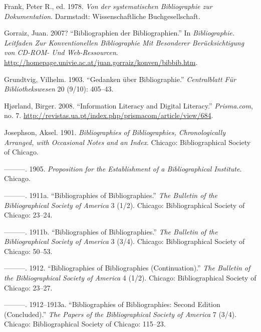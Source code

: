\documentclass[a4paper,
fontsize=11pt,
oneside,
numbers=noperiodatend,
parskip=half-,
bibliography=totoc,
final
]{scrartcl}
\begin{document}
Frank, Peter R., ed. 1978. \emph{Von der systematischen Bibliographie
zur Dokumentation}. Darmstadt: Wissenschaftliche Buchgesellschaft.

Gorraiz, Juan. 2007? ``Bibliographien der Bibliographien.'' In
\emph{Bibliographie. Leitfaden Zur Konventionellen Bibliographie Mit
Besonderer Berücksichtigung von CD-ROM- Und Web-Ressourcen}.
\url{http://homepage.univie.ac.at/juan.gorraiz/konven/bibbib.htm}.

Grundtvig, Vilhelm. 1903. ``Gedanken über Bibliographie.''
\emph{Centralblatt Für Bibliothekswesen} 20 (9/10): 405--43.

Hjørland, Birger. 2008. ``Information Literacy and Digital Literacy.''
\emph{Prisma.com}, no. 7.
\url{http://revistas.ua.pt/index.php/prismacom/article/view/684}.

Josephson, Aksel. 1901. \emph{Bibliographies of Bibliographies,
Chronologically Arranged, with Occasional Notes and an Index}. Chicago:
Bibliographical Society of Chicago.

---------. 1905. \emph{Proposition for the Establishment of a
Bibliographical Institute}. Chicago.

---------. 1911a. ``Bibliographies of Bibliographies.'' \emph{The
Bulletin of the Bibliographical Society of America} 3 (1/2). Chicago:
Bibliographical Society of Chicago: 23--24.

---------. 1911b. ``Bibliographies of Bibliographies.'' \emph{The
Bulletin of the Bibliographical Society of America} 3 (3/4). Chicago:
Bibliographical Society of Chicago: 50--53.

---------. 1912. ``Bibliographies of Bibliographies (Continuation).''
\emph{The Bulletin of the Bibliographical Society of America} 4 (1/2).
Chicago: Bibliographical Society of Chicago: 23--27.

---------. 1912--1913a. ``Bibliographies of Bibliographies: Second
Edition (Concluded).'' \emph{The Papers of the Bibliographical Society
of America} 7 (3/4). Chicago: Bibliographical Society of Chicago:
115--23.
\end{document}
